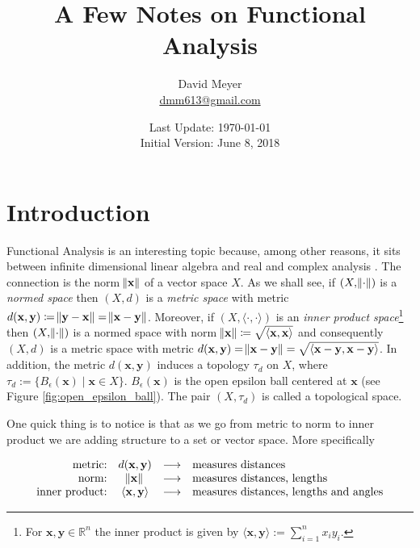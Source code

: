\documentclass{article}
\title{A Few Notes on Functional Analysis}
\author{David Meyer \\ \href{mailto:dmm613@gmail.com}
                            {dmm613@gmail.com}}
\date{Last Update: \today \\
	 {\vspace{1.00mm} \small Initial Version: June 8, 2018}}
\theoremstyle{definition}
\begin{document}
\maketitle
%
%
%
\section{Introduction}
Functional Analysis is an interesting topic because, among other
reasons, it sits between infinite dimensional linear algebra and
real and complex analysis \cite{fa_mit}. The connection is the
norm $\norm{\mathbf{x}}$ of a vector space $X$. As we shall see,
if $(X,\norm{\cdot})$ is a \emph{normed space} then $(X,d)$ is a
\emph{metric space} with metric $d(\mathbf{x},\mathbf{y})
\coloneqq \norm{\mathbf{y}-\mathbf{x}} =
\norm{\mathbf{x}-\mathbf{y}}$. Moreover, if
$(X,\langle\cdot,\cdot\rangle)$ is an \emph{inner product
space}\footnote{For $\mathbf{x}, \mathbf{y} \in \mathbb{R}^{n}$
the inner product is given by $\langle \mathbf{x}, \mathbf{y}
\rangle := \sum\limits_{i = 1}^{n} x_i y_i$.}  then
$(X,\norm{\cdot})$ is a normed space with norm $\norm{\mathbf{x}}
\coloneqq \sqrt{\langle \mathbf{x},\mathbf{x}\rangle}$ and
consequently $(X,d)$ is a metric space with metric
$d(\mathbf{x},\mathbf{y}) = \norm{\mathbf{x}-\mathbf{y}} =
\sqrt{\langle
\mathbf{x}-\mathbf{y},\mathbf{x}-\mathbf{y}\rangle}$.  In
addition, the metric $d(\mathbf{x},\mathbf{y})$ induces a
topology $\tau_d$ on $X$, where $\tau_d :=
\{B_{\epsilon}(\mathbf{x}) \mid \mathbf{x} \in X \}$.
$B_{\epsilon}(\mathbf{x})$ is the open epsilon ball centered
at $\mathbf{x}$ (see Figure \ref{fig:open_epsilon_ball}). 
The pair $(X,\tau_d)$ is called a topological space.

\bigskip
\noindent
One quick thing is to notice is that as we go from metric to norm
to inner product we are adding structure to a set or vector
space.  More specifically

\begin{equation*}
\begin{array}{rclll}
\text{metric:}        & d(\mathbf{x},\mathbf{y})                   
		& \longrightarrow & \text{measures distances} \\
\text{norm:}          & \norm{\mathbf{x}}
		& \longrightarrow & \text{measures distances, lengths} \\
\text{inner product:} & \langle\mathbf{x},\mathbf{y}\rangle 
		& \longrightarrow & \text{measures distances, lengths and angles}
\end{array}
\end{equation*}
\end{document}
